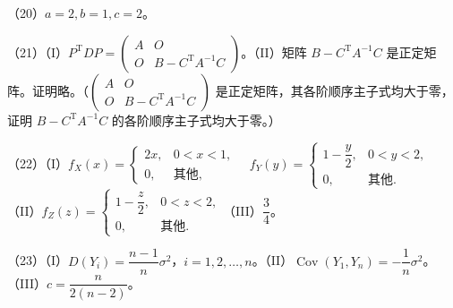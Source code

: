\documentclass[UTF8,12pt]{ctexart}
\begin{document}
（20）\(\displaystyle a=2,\allowbreak b=1,\allowbreak c=2\)。


（21）（I）\(\displaystyle P^{\mathrm T}DP=\begin{pmatrix}A&O\\O&B-C^{\mathrm T}A^{-1}C\end{pmatrix}\)。（II）矩阵 \(\displaystyle B-C^{\mathrm T}A^{-1}C\) 是正定矩阵。证明略。（\(\displaystyle \begin{pmatrix}A&O\\O&B-C^{\mathrm T}A^{-1}C\end{pmatrix}\) 是正定矩阵，其各阶顺序主子式均大于零，证明 \(\displaystyle B-C^{\mathrm T}A^{-1}C\) 的各阶顺序主子式均大于零。）


（22）（I）\(\displaystyle f_X(x)=\begin{cases}2x,\allowbreak &0<x<1,\allowbreak \\0,\allowbreak &\text{其他},\allowbreak \end{cases}\quad f_Y(y)=\begin{cases}1-\dfrac{\displaystyle y}{\displaystyle 2},\allowbreak &0<y<2,\allowbreak \\0,\allowbreak &\text{其他}.\end{cases}\)（II）\(\displaystyle f_Z(z)=\begin{cases}1-\dfrac{\displaystyle z}{\displaystyle 2},\allowbreak &0<z<2,\allowbreak \\0,\allowbreak &\text{其他}.\end{cases}\)（III）\(\displaystyle \dfrac{\displaystyle 3}{\displaystyle 4}\)。


（23）（I）\(\displaystyle D(Y_i)=\dfrac{\displaystyle n-1}{\displaystyle n}\sigma^2\)，\(\displaystyle i=1,\allowbreak 2,\allowbreak \ldots,\allowbreak n\)。（II）\(\displaystyle \operatorname{Cov}(Y_1,\allowbreak Y_n)=-\dfrac{\displaystyle 1}{\displaystyle n}\sigma^2\)。（III）\(\displaystyle c=\dfrac{\displaystyle n}{\displaystyle 2(n-2)}\)。
\end{document}

